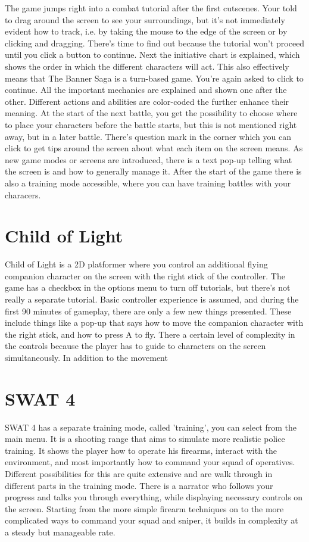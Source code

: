 The game jumps right into a combat tutorial after the first cutscenes. Your told to drag around the screen to see your surroundings, but it's not immediately evident how to track, i.e. by taking the mouse to the edge of the screen or by clicking and dragging. There's time to find out because the tutorial won't proceed until you click a button to continue. Next the initiative chart is explained, which shows the order in which the different characters will act. This also effectively means that The Banner Saga is a turn-based game. You're again asked to click to continue. All the important mechanics are explained and shown one after the other. Different actions and abilities are color-coded the further enhance their meaning. At the start of the next battle, you get the possibility to choose where to place your characters before the battle starts, but this is not mentioned right away, but in a later battle. There's question mark in the corner which you can click to get tips around the screen about what each item on the screen means. As new game modes or screens are introduced, there is a text pop-up telling what the screen is and how to generally manage it. After the start of the game there is also a training mode accessible, where you can have training battles with your characers.

\section{Child of Light}

Child of Light is a 2D platformer where you control an additional flying companion character on the screen with the right stick of the controller. The game has a checkbox in the options menu to turn off tutorials, but there's not really a separate tutorial. Basic controller experience is assumed, and during the first 90 minutes of gameplay, there are only a few new things presented. These include things like a pop-up that says how to move the companion character with the right stick, and how to press A to fly. There a certain level of complexity in the controls because the player has to guide to characters on the screen simultaneously. In addition to the movement

\section{SWAT 4}

SWAT 4 has a separate training mode, called 'training', you can select from the main menu. It is a shooting range that aims to simulate more realistic police training. It shows the player how to operate his firearms, interact with the environment, and most importantly how to command your squad of operatives. Different possibilities for this are quite extensive and are walk through in different parts in the training mode. There is a narrator who follows your progress and talks you through everything, while displaying necessary controls on the screen. Starting from the more simple firearm techniques on to the more complicated ways to command your squad and sniper, it builds in complexity at a steady but manageable rate.